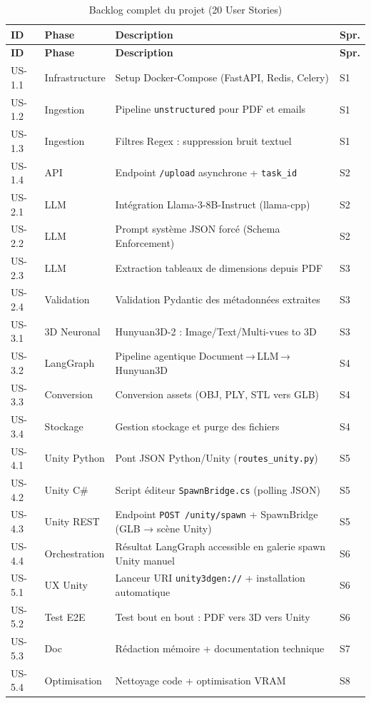 \documentclass[12pt,a4paper,oneside]{report}
\newcommand{\theadrow}{\rowcolor{tekupblue!12}}
\begin{document}
\begin{longtable}{@{}p{1.2cm}p{2.6cm}p{7.5cm}l@{}}
\caption{Backlog complet du projet (20 User Stories)}\label{tab:backlog}\\
\toprule
\theadrow
\textbf{ID} & \textbf{Phase} & \textbf{Description} & \textbf{Spr.} \\
\midrule\endfirsthead
\toprule
\theadrow
\textbf{ID}&\textbf{Phase}&\textbf{Description}&\textbf{Spr.}\\\midrule\endhead
\rowcolor{gray!8}
US-1.1 & Infrastructure & Setup Docker-Compose (FastAPI, Redis, Celery) & S1 \\
US-1.2 & Ingestion      & Pipeline \texttt{unstructured} pour PDF et emails & S1 \\
US-1.3 & Ingestion      & Filtres Regex : suppression bruit textuel & S1 \\
US-1.4 & API            & Endpoint \texttt{/upload} asynchrone + \texttt{task\_id} & S2 \\
\rowcolor{gray!8}
US-2.1 & LLM            & Intégration Llama-3-8B-Instruct (llama-cpp) & S2 \\
US-2.2 & LLM            & Prompt système JSON forcé (Schema Enforcement) & S2 \\
US-2.3 & LLM            & Extraction tableaux de dimensions depuis PDF & S3 \\
US-2.4 & Validation     & Validation Pydantic des métadonnées extraites & S3 \\
\rowcolor{gray!8}
US-3.1 & 3D Neuronal    & Hunyuan3D-2 : Image/Text/Multi-vues to 3D & S3 \\
US-3.2 & LangGraph      & Pipeline agentique Document\,→\,LLM\,→\,Hunyuan3D & S4 \\
US-3.3 & Conversion     & Conversion assets (OBJ, PLY, STL vers GLB) & S4 \\
US-3.4 & Stockage       & Gestion stockage et purge des fichiers & S4 \\
\rowcolor{gray!8}
US-4.1 & Unity Python   & Pont JSON Python/Unity (\texttt{routes\_unity.py}) & S5 \\
US-4.2 & Unity C\#      & Script éditeur \texttt{SpawnBridge.cs} (polling JSON) & S5 \\
US-4.3 & Unity REST     & Endpoint \texttt{POST /unity/spawn} + SpawnBridge (GLB → scène Unity) & S5 \\
US-4.4 & Orchestration  & Résultat LangGraph accessible en galerie \textrightarrow{} spawn Unity manuel & S6 \\
\rowcolor{gray!8}
US-5.1 & UX Unity       & Lanceur URI \texttt{unity3dgen://} + installation automatique & S6 \\
US-5.2 & Test E2E       & Test bout en bout : PDF vers 3D vers Unity & S6 \\
US-5.3 & Doc            & Rédaction mémoire + documentation technique & S7 \\
US-5.4 & Optimisation   & Nettoyage code + optimisation VRAM & S8 \\
\bottomrule
\end{longtable}
\end{document}
